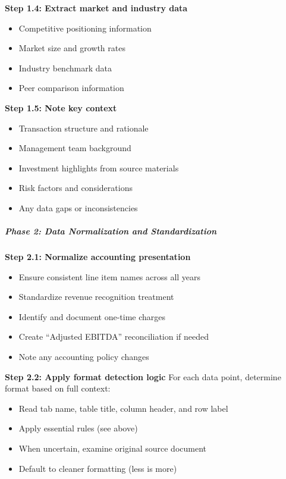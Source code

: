 \documentclass[11pt]{article}
\begin{document}
\textbf{Step 1.4: Extract market and industry data}

\begin{itemize}[leftmargin=*,itemsep=2pt,topsep=2pt]
\item {} Competitive positioning information
\item {} Market size and growth rates
\item {} Industry benchmark data
\item {} Peer comparison information
\end{itemize}

\textbf{Step 1.5: Note key context}

\begin{itemize}[leftmargin=*,itemsep=2pt,topsep=2pt]
\item {} Transaction structure and rationale
\item {} Management team background
\item {} Investment highlights from source materials
\item {} Risk factors and considerations
\item {} Any data gaps or inconsistencies
\end{itemize}

\subparagraph{Phase 2: Data Normalization and Standardization}\mbox{}\par

\textbf{Step 2.1: Normalize accounting presentation}

\begin{itemize}[leftmargin=*,itemsep=2pt,topsep=2pt]
\item {} Ensure consistent line item names across all years
\item {} Standardize revenue recognition treatment
\item {} Identify and document one-time charges
\item {} Create ``Adjusted EBITDA'' reconciliation if needed
\item {} Note any accounting policy changes
\end{itemize}

\textbf{Step 2.2: Apply format detection logic} For each data point, determine format based on full context:

\begin{itemize}[leftmargin=*,itemsep=2pt,topsep=2pt]
\item {} Read tab name, table title, column header, and row label
\item {} Apply essential rules (see above)
\item {} When uncertain, examine original source document
\item {} Default to cleaner formatting (less is more)
\end{itemize}
\end{document}
